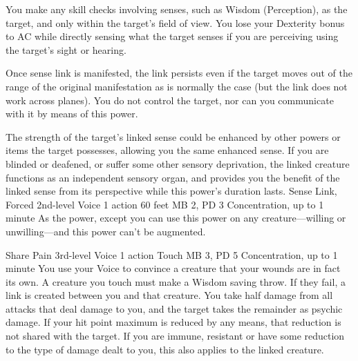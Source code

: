 You make any skill checks involving senses, such as Wisdom
(Perception), as the target, and only within the target's
field of view. You lose your Dexterity bonus to AC while directly
sensing what the target senses if you are perceiving using
the target's sight or hearing.

Once sense link is manifested, the link persists even if the
target moves out of the range of the original manifestation
as is normally the case (but the link does not work across
planes). You do not control the target, nor can you communicate
with it by means of this power.

The strength of the target's linked sense could be enhanced
by other powers or items the target possesses, allowing you
the same enhanced sense. If you are blinded or deafened, or
suffer some other sensory deprivation, the linked creature
functions as an independent sensory organ, and provides you
the benefit of the linked sense from its perspective while
this power's duration lasts.
\DndPowerHeader%
    {Sense Link, Forced\label{pwr:sense_link_forced}}
    {2nd-level Voice}
    {1 action}
    {60 feet}
    {MB 2, PD 3}
    {Concentration, up to 1 minute}
As the  power, except you
can use this power on any creature---willing or unwilling---and
this power can't be augmented.

\DndPowerHeader%
    {Share Pain\label{pwr:share_pain}}
    {3rd-level Voice}
    {1 action}
    {Touch}
    {MB 3, PD 5}
    {Concentration, up to 1 minute}
You use your Voice to convince a creature
that your wounds are in fact its own. A creature you touch
must make a Wisdom saving throw. If they fail, a link is created
between you and that creature. You take half damage from all
attacks that deal damage to you, and the target takes the
remainder as psychic damage. If your hit point maximum is
reduced by any means, that reduction is not shared with the
target. If you are immune, resistant or have some reduction
to the type of damage dealt to you, this also applies to the
linked creature.

